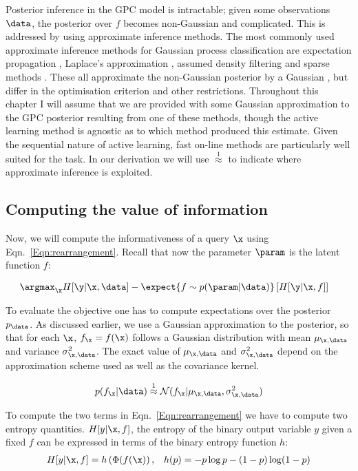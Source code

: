 Posterior inference in the GPC model is intractable; given some observations $\data$, the posterior over $f$ becomes non-Gaussian and complicated. This is addressed by using approximate inference methods. The most commonly used approximate inference methods for Gaussian process classification are expectation propagation \citep[EP,][]{Minka2002}, Laplace's approximation \citep{williams1998}, assumed density filtering \citep[ADF,][]{csato2000} and sparse methods \citep{candela05sparseGP}. These all approximate the non-Gaussian posterior by a Gaussian \citep{Nickisch2008}, but differ in the optimisation criterion and other restrictions. Throughout this chapter I will assume that we are provided with some Gaussian approximation to the GPC posterior resulting from one of these methods, though the active learning method is agnostic as to which method produced this estimate. Given the sequential nature of active learning, fast on-line methods \citep{Csato2002} are particularly well suited for the task. In our derivation we will use {\scriptsize$\stackrel{1}{\approx}$} to indicate where approximate inference is exploited.

\subsection{Computing the value of information}

Now, we will compute the informativeness of a query $\x$ using Eqn.\  \eqref{Eqn:rearrangement}. Recall that now the parameter $\param$ is the latent function $f$:

\begin{align}
	&\argmax_{\x} H[\y \vert \x, \data] - \expect{f\sim p(\param|\data)} \left[ H[\y \vert \x,f] \right]
\end{align}

To evaluate the objective one has to compute expectations over the posterior $p_\data$. As discussed earlier, we use a Gaussian approximation to the posterior, so that for each $\x$, $f_{\x} = f(\x)$ follows a Gaussian distribution with mean $\mu_{\x,\data}$ and variance $\sigma_{\x,\data}^2$. The exact value of $\mu_{\x,\data}$ and $\sigma_{\x,\data}^2$ depend on the approximation scheme used as well as the covariance kernel.

\begin{align}
	p(f_{\x}\vert\data) \stackrel{1}{\approx} \mathcal{N}(f_{\x}\vert \mu_{\x,\data},\sigma_{\x,\data}^2) 
\end{align}

To compute the two terms in Eqn.\ \eqref{Eqn:rearrangement} we have to compute two entropy quantities. $H[y\vert\x,f]$, the entropy of the binary output variable $y$ given a fixed $f$ can be expressed in terms of the binary entropy function $h$: 
\begin{align}
H[y\vert\x,f] = h\left(\Phi(f(\x)\right), && h(p)=- p\log p - (1-p)\log(1-p)
\end{align}

